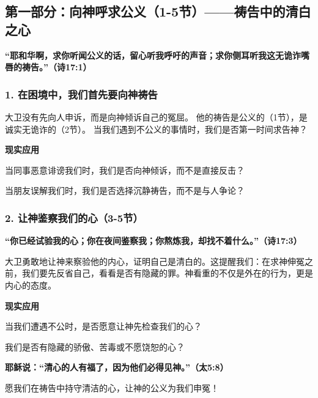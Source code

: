 \documentclass[a4paper, 12pt]{article}
\begin{document}
\subsection*{第一部分：向神呼求公义（1-5节）——祷告中的清白之心  }
\textbf{“耶和华啊，求你听闻公义的话，留心听我呼吁的声音；求你侧耳听我这无诡诈嘴唇的祷告。”（诗17:1）}  
\subsubsection*{1. 在困境中，我们首先要向神祷告  }
\hspace{0.6cm}大卫没有先向人申诉，而是向神倾诉自己的冤屈。  他的祷告是公义的（1节），是诚实无诡诈的（2节）。  当我们遇到不公义的事情时，我们是否第一时间求告神？

\vspace{0.2cm}

\textbf{现实应用}

\hspace{0.6cm}当同事恶意诽谤我们时，我们是否向神倾诉，而不是直接反击？  

\hspace{0.6cm}当朋友误解我们时，我们是否选择沉静祷告，而不是与人争论？  

\subsubsection*{2. 让神鉴察我们的心（3-5节）  }
\textbf{“你已经试验我的心；你在夜间鉴察我；你熬炼我，却找不着什么。”（诗17:3）}  

\vspace{0.2cm}

大卫勇敢地让神来察验他的内心，证明自己是清白的。这提醒我们：在求神伸冤之前，我们要先反省自己，看看是否有隐藏的罪。神看重的不仅是外在的行为，更是内心的态度。

\vspace{0.2cm}

\textbf{现实应用}

\hspace{0.6cm}当我们遭遇不公时，是否愿意让神先检查我们的心？ 

\hspace{0.6cm}我们是否有隐藏的骄傲、苦毒或不愿饶恕的心？

\vspace{0.2cm}

\textbf{耶稣说：“清心的人有福了，因为他们必得见神。”（太5:8）}  

愿我们在祷告中持守清洁的心，让神的公义为我们申冤！  
\end{document}
